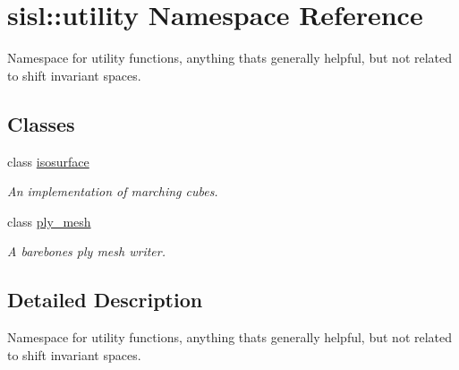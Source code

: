 \hypertarget{namespacesisl_1_1utility}{}\section{sisl\+:\+:utility Namespace Reference}
\label{namespacesisl_1_1utility}


Namespace for utility functions, anything that\textquotesingle{}s generally helpful, but not related to shift invariant spaces.  


\subsection*{Classes}
\begin{DoxyCompactItemize}
\item 
class \hyperlink{classsisl_1_1utility_1_1isosurface}{isosurface}
\begin{DoxyCompactList}\small\item\em An implementation of marching cubes. \end{DoxyCompactList}\item 
class \hyperlink{classsisl_1_1utility_1_1ply__mesh}{ply\+\_\+mesh}
\begin{DoxyCompactList}\small\item\em A barebones ply mesh writer. \end{DoxyCompactList}\end{DoxyCompactItemize}


\subsection{Detailed Description}
Namespace for utility functions, anything that\textquotesingle{}s generally helpful, but not related to shift invariant spaces. 